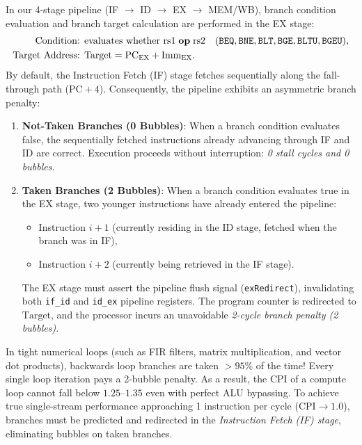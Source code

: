 In our 4-stage pipeline (\textsc{IF} $\to$ \textsc{ID} $\to$ \textsc{EX} $\to$ \textsc{MEM/WB}), branch condition evaluation and branch target calculation are performed in the \textsc{EX} stage:
\begin{align}
\text{Condition: } & \text{evaluates whether } \text{rs1} \mathrel{\mathbf{op}} \text{rs2} \quad (\texttt{BEQ}, \texttt{BNE}, \texttt{BLT}, \texttt{BGE}, \texttt{BLTU}, \texttt{BGEU}), \\
\text{Target Address: } & \text{Target} = \text{PC}_{\textsc{EX}} + \text{Imm}_{\textsc{EX}}.
\end{align}
By default, the Instruction Fetch (\textsc{IF}) stage fetches sequentially along the fall-through path ($\text{PC} + 4$). Consequently, the pipeline exhibits an asymmetric branch penalty:
\begin{enumerate}
    \item \textbf{Not-Taken Branches (0 Bubbles)}: When a branch condition evaluates false, the sequentially fetched instructions already advancing through \textsc{IF} and \textsc{ID} are correct. Execution proceeds without interruption: \textit{0 stall cycles and 0 bubbles}.
    \item \textbf{Taken Branches (2 Bubbles)}: When a branch condition evaluates true in the \textsc{EX} stage, two younger instructions have already entered the pipeline:
    \begin{itemize}
        \item Instruction $i+1$ (currently residing in the \textsc{ID} stage, fetched when the branch was in \textsc{IF}),
        \item Instruction $i+2$ (currently being retrieved in the \textsc{IF} stage).
    \end{itemize}
    The \textsc{EX} stage must assert the pipeline flush signal (\texttt{exRedirect}), invalidating both \texttt{if\_id} and \texttt{id\_ex} pipeline registers. The program counter is redirected to $\text{Target}$, and the processor incurs an unavoidable \textit{2-cycle branch penalty (2 bubbles)}.
\end{enumerate}

In tight numerical loops (such as FIR filters, matrix multiplication, and vector dot products), backwards loop branches are taken $>95\%$ of the time! Every single loop iteration pays a 2-bubble penalty. As a result, the CPI of a compute loop cannot fall below $1.25\text{--}1.35$ even with perfect ALU bypassing. To achieve true single-stream performance approaching 1 instruction per cycle ($\text{CPI} \to 1.0$), branches must be predicted and redirected in the \textit{Instruction Fetch (\textsc{IF}) stage}, eliminating bubbles on taken branches.


